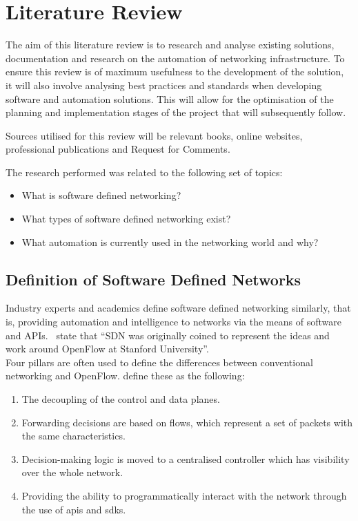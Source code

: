 \chapter{Literature Review}
\label{chap:litreview}
The aim of this literature
review is to research and analyse existing
solutions, documentation and
research on the automation of networking
infrastructure. To ensure this review
is of maximum usefulness to the development of the solution, it will also
involve analysing best practices and
standards when developing software and
automation solutions. This will allow
for the optimisation of the planning and
implementation stages of the project
that will subsequently follow.

Sources utilised
for this review will be relevant
books, online websites,
professional
publications and Request for Comments.

The research performed was related to the following set of
topics:
\begin{itemize}
      \item What is software defined networking?
      \item What types of software defined networking exist?
      \item What automation is currently used in the networking world and why?
\end{itemize}

\section{Definition of Software Defined Networks}
\label{litreview:definition}

Industry experts and academics define
software defined networking
similarly, that is, providing automation and
intelligence to networks via the
means of software and APIs.~\citet{11} state
that ``SDN was originally coined
to represent the ideas and work around
OpenFlow at Stanford University''.\\
Four pillars are often used to define the differences between conventional
networking and OpenFlow. \citet{11} define these as the
following:
\begin{enumerate}
      \item The decoupling of the control and data planes.
      \item Forwarding decisions are based on flows, which represent a set of packets with the same characteristics.
      \item Decision-making logic is moved to a centralised controller which has visibility over the whole network.
      \item Providing the ability to programmatically interact with the network through the use of \gls{api}s and \gls{sdk}s.
\end{enumerate}

